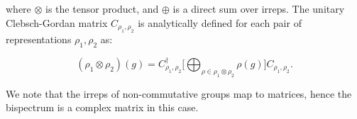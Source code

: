 where $\otimes$ is the tensor product, and $\oplus$ is a direct sum over irreps. The unitary Clebsch-Gordan matrix $C_{\rho_1,\rho_2}$ is analytically defined for each pair of representations $\rho_1, \rho_2$ as:

\begin{equation}
    (\rho_1 \otimes \rho_2)(g) = C_{\rho_1,\rho_2}^\dagger \Big[ \bigoplus_{\rho \in \rho_1 \otimes \rho_2} \rho(g) \Big] C_{\rho_1,\rho_2}.
    \label{eqn:non-commutative-bs}
\end{equation}

We note that the irreps of non-commutative groups map to matrices, hence the bispectrum is a complex matrix in this case.






